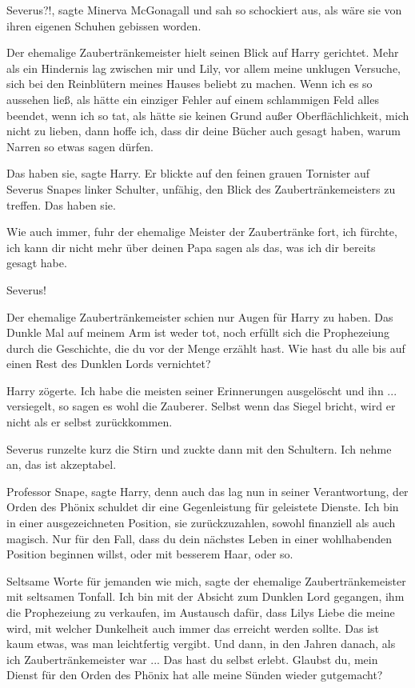 \glqq{}Severus?!\grqq{}, sagte Minerva McGonagall und sah so schockiert aus, als
wäre sie von ihren eigenen Schuhen gebissen worden.

Der ehemalige Zaubertränkemeister hielt seinen Blick auf Harry gerichtet. \glqq{}
Mehr als ein Hindernis lag zwischen mir und Lily, vor allem meine unklugen
Versuche, sich bei den Reinblütern meines Hauses beliebt zu machen. Wenn ich es
so aussehen ließ, als hätte ein einziger Fehler auf einem schlammigen Feld alles
beendet, wenn ich so tat, als hätte sie keinen Grund außer Oberflächlichkeit,
mich nicht zu lieben, dann hoffe ich, dass dir deine Bücher auch gesagt haben,
warum Narren so etwas sagen dürfen.\grqq{}

\glqq{}Das haben sie\grqq{}, sagte Harry. Er blickte auf den feinen grauen
Tornister auf Severus Snapes linker Schulter, unfähig, den Blick des
Zaubertränkemeisters zu treffen. \glqq{}Das haben sie.\grqq{}

\glqq{}Wie auch immer\grqq{}, fuhr der ehemalige Meister der Zaubertränke fort,
\glqq{}ich fürchte, ich kann dir nicht mehr über deinen Papa sagen als das, was
ich dir bereits gesagt habe.\grqq{}

\glqq{}Severus!\grqq{}

Der ehemalige Zaubertränkemeister schien nur Augen für Harry zu haben. \glqq{}Das
Dunkle Mal auf meinem Arm ist weder tot, noch erfüllt sich die Prophezeiung
durch die Geschichte, die du vor der Menge erzählt hast. Wie hast du alle bis
auf einen Rest des Dunklen Lords vernichtet?\grqq{}

Harry zögerte. \glqq{}Ich habe die meisten seiner Erinnerungen ausgelöscht und
ihn ... versiegelt, so sagen es wohl die Zauberer. Selbst wenn das Siegel
bricht, wird er nicht als er selbst zurückkommen.\grqq{}

Severus runzelte kurz die Stirn und zuckte dann mit den Schultern. \glqq{}Ich
nehme an, das ist akzeptabel.\grqq{}

\glqq{}Professor Snape\grqq{}, sagte Harry, denn auch das lag nun in seiner
Verantwortung, \glqq{}der Orden des Phönix schuldet dir eine Gegenleistung für
geleistete Dienste. Ich bin in einer ausgezeichneten Position, sie
zurückzuzahlen, sowohl finanziell als auch magisch. Nur für den Fall, dass du
dein nächstes Leben in einer wohlhabenden Position beginnen willst, oder mit
besserem Haar, oder so.\grqq{}

\glqq{}Seltsame Worte für jemanden wie mich\grqq{}, sagte der ehemalige
Zaubertränkemeister mit seltsamen Tonfall. \glqq{}Ich bin mit der Absicht zum
Dunklen Lord gegangen, ihm die Prophezeiung zu verkaufen, im Austausch dafür,
dass Lilys Liebe die meine wird, mit welcher Dunkelheit auch immer das erreicht
werden sollte. Das ist kaum etwas, was man leichtfertig vergibt. Und dann, in
den Jahren danach, als ich Zaubertränkemeister war ... Das hast du selbst erlebt.
Glaubst du, mein Dienst für den Orden des Phönix hat alle meine Sünden wieder
gutgemacht?\grqq{}

